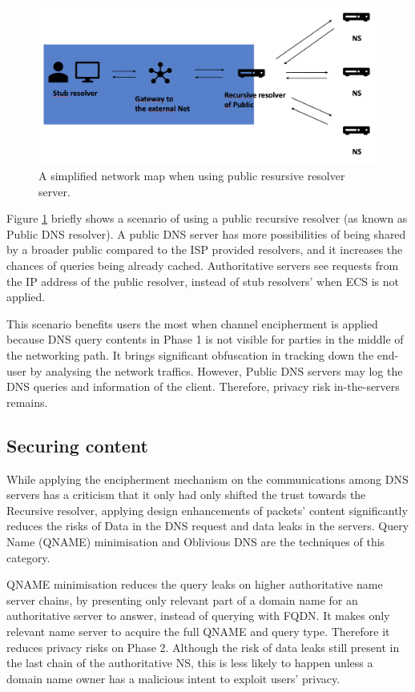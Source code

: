 \documentclass[a4paper,12pt]{article}
\begin{document}
\begin{figure}[h!]
    \begin{center}
    \includegraphics*[width=0.6\columnwidth]{img/public-recursive}
    \end{center}
    \caption{A simplified network map when using public resursive resolver server.}
    \label{publicrecursive}
\end{figure}
Figure \ref{publicrecursive} briefly shows a scenario of using a public recursive resolver (as known as Public DNS resolver).
A public DNS server has more possibilities of being shared by a broader public compared to the ISP provided resolvers, and it increases the chances of queries being already cached. Authoritative servers see requests from the IP address of the public resolver, instead of stub resolvers' when ECS is not applied.

This scenario benefits users the most when channel encipherment is applied because DNS query contents in Phase 1 is not visible for parties in the middle of the networking path. It brings significant obfuscation in tracking down the end-user by analysing the network traffics. However, Public DNS servers may log the DNS queries and information of the client. Therefore, privacy risk in-the-servers remains.

\FloatBarrier
\subsection{Securing content}
While applying the encipherment mechanism on the communications among DNS servers has a criticism that it only had only shifted the trust towards the Recursive resolver, applying design enhancements of packets' content significantly reduces the risks of Data in the DNS request and data leaks in the servers.
Query Name (QNAME) minimisation \cite{bortzmeyer2016dns} and Oblivious DNS \cite{annee-dprive-oblivious-dns-00} are the techniques of this category.

QNAME minimisation reduces the query leaks on higher authoritative name server chains, by presenting only relevant part of a domain name for an authoritative server to answer, instead of querying with FQDN.
It makes only relevant name server to acquire the full QNAME and query type. Therefore it reduces privacy risks on Phase 2.
Although the risk of data leaks still present in the last chain of the authoritative NS, this is less likely to happen unless a domain name owner has a malicious intent to exploit users' privacy.
\end{document}
